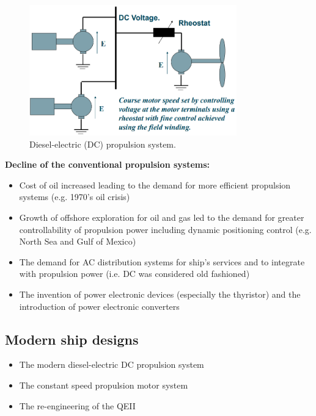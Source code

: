 \begin{figure}[H]
    \centering
    \includegraphics[width = 0.8\textwidth]{img/figure57.png}
    \caption{Diesel-electric (DC) propulsion system.}
\end{figure}

\textbf{Decline of the conventional propulsion systems:}
\begin{itemize}
    \item Cost of oil increased leading to the demand for more efficient propulsion systems (e.g. 1970's oil crisis)
    \item Growth of offshore exploration for oil and gas led to the demand for greater controllability of propulsion power including dynamic positioning control (e.g. North Sea and Gulf of Mexico)
    \item The demand for AC distribution systems for ship's services and to integrate with propulsion power (i.e. DC was considered old fashioned)
    \item The invention of power electronic devices (especially the thyristor) and the introduction of power electronic converters
\end{itemize}

\subsection{Modern ship designs}
\begin{itemize}
    \item The modern diesel-electric DC propulsion system
    \item The constant speed propulsion motor system
    \item The re-engineering of the QEII
\end{itemize}

